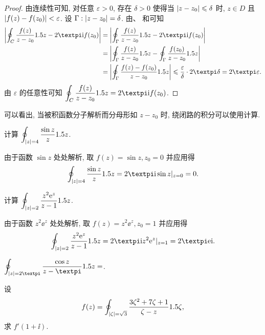 \begin{proof}
  由连续性可知, 对任意 $\varepsilon>0$, 存在 $\delta>0$ 使得当 $\lvert z-z_0\rvert\leqslant\delta$ 时, $z\in D$ 且 $\lvert f(z)-f(z_0)\rvert<\varepsilon$.
  设 $\Gamma:\lvert z-z_0\rvert=\delta$.
  由\thmCCC、 和\thmGrowUp 可知
  \begin{align*}
      \biggabs{\oint_C \frac{f(z)}{z-z_0}\d z-2\cpi\ii f(z_0)}&
    =\biggabs{\oint_\Gamma\frac{f(z)}{z-z_0}\d z-2\cpi\ii f(z_0)}\\&
    =\biggabs{\oint_\Gamma\frac{f(z)}{z-z_0}\d z-\oint_\Gamma\frac{f(z_0)}{z-z_0}\d z}\\&
    =\biggabs{\oint_\Gamma\frac{f(z)-f(z_0)}{z-z_0}\d z}
    \le\frac\varepsilon \delta\cdot 2\cpi \delta=2\cpi \varepsilon.
  \end{align*}
  由 $\varepsilon$ 的任意性可知 
  $\doint_C\frac{f(z)}{z-z_0}\d z=2\cpi\ii f(z_0)$.
\end{proof}

可以看出, 当被积函数分子解析而分母形如 $z-z_0$ 时, 绕闭路的积分可以使用\thmCI 计算.

\begin{example}
  计算 $\displaystyle\oint_{\lvert z\rvert=4}\frac{\sin z}z1.5 z$.
\end{example}

\begin{solution}
  由于函数 $\sin z$ 处处解析, 取 $f(z)=\sin z, z_0=0$ 并应用\thmCI 得
  \[
    \oint_{\abs{z}=4} \frac{\sin z}z\d z
    =2\cpi\ii \sin z|_{z=0}
    =0.
  \]
\end{solution}

\begin{example}
  计算 $\displaystyle\oint_{\lvert z\rvert=2} \frac{z^2\mathrm{e}^z}{z-1}1.5 z$.
\end{example}

\begin{solution}
  由于函数 $z^2\ee^z$ 处处解析, 取 $f(z)=z^2\ee^z, z_0=1$ 并应用\thmCI 得
  \[
    \oint_{\abs{z}=2} \frac{z^2\ee^z}{z-1}\d z
    =2\cpi\ii z^2\ee^z|_{z=1}
    =2\cpi\ee\ii.
  \]
\end{solution}

\begin{exercise}
  $\doint_{\abs{z}=2\cpi}\frac{\cos z}{z-\cpi}\d z=$\fillblank{}.
\end{exercise}

\begin{example}
  设
  \[
    f(z)=\displaystyle\oint_{\lvert\zeta\rvert=\sqrt3}\frac{3\zeta^2+7\zeta+1}{\zeta-z}1.5 \zeta,
  \]
  求 $f'(1+\ii)$.
\end{example}

